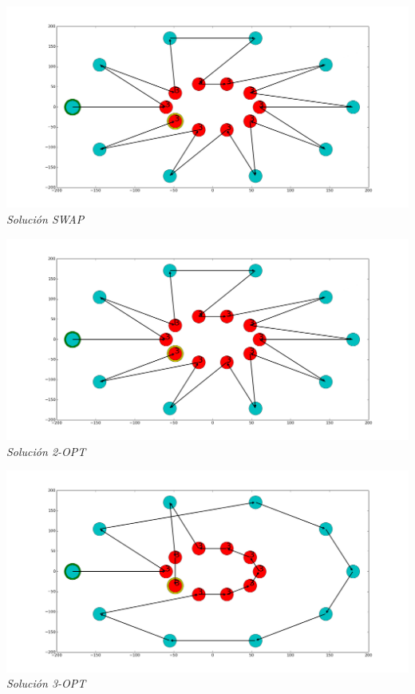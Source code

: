 \vspace*{0.3cm} \vspace*{0.3cm}
  \begin{center}
 \includegraphics[scale=0.3]{./EJ3/anillosswap.png}\\
 {            \textit{Soluci\'on SWAP}}
  \end{center}
  \vspace*{0.3cm}

\vspace*{0.3cm} \vspace*{0.3cm}
  \begin{center}
 \includegraphics[scale=0.3]{./EJ3/anillos2opt.png}\\
 {            \textit{Soluci\'on 2-OPT}}
  \end{center}
  \vspace*{0.3cm}


\vspace*{0.3cm} \vspace*{0.3cm}
  \begin{center}
 \includegraphics[scale=0.3]{./EJ3/anillos3opt.png}\\
 {            \textit{Soluci\'on 3-OPT}}
  \end{center}
  \vspace*{0.3cm}


